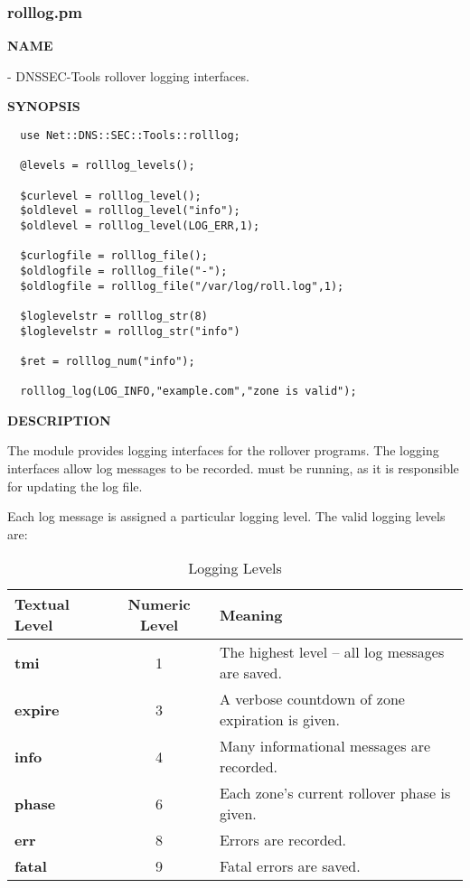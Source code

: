 \clearpage

\subsubsection{rolllog.pm}

{\bf NAME}

 - DNSSEC-Tools rollover logging
interfaces.

{\bf SYNOPSIS}

\begin{verbatim}
  use Net::DNS::SEC::Tools::rolllog;

  @levels = rolllog_levels();

  $curlevel = rolllog_level();
  $oldlevel = rolllog_level("info");
  $oldlevel = rolllog_level(LOG_ERR,1);

  $curlogfile = rolllog_file();
  $oldlogfile = rolllog_file("-");
  $oldlogfile = rolllog_file("/var/log/roll.log",1);

  $loglevelstr = rolllog_str(8)
  $loglevelstr = rolllog_str("info")

  $ret = rolllog_num("info");

  rolllog_log(LOG_INFO,"example.com","zone is valid");
\end{verbatim}

{\bf DESCRIPTION}

The  module provides logging interfaces
for the rollover programs.  The logging interfaces allow log messages to be
recorded.   must be running, as it is responsible for updating
the log file.

Each log message is assigned a particular logging level.  The valid logging
levels are:

\begin{table}[h]
\begin{center}
\begin{tabular}{|l|c|l|}
\hline
{\bf Textual Level} & {\bf Numeric Level} & {\bf Meaning} \\
\hline
{\bf tmi}    & 1 & The highest level -- all log messages are saved.	\\
{\bf expire} & 3 & A verbose countdown of zone expiration is given.	\\
{\bf info}   & 4 & Many informational messages are recorded.		\\
{\bf phase}  & 6 & Each zone's current rollover phase is given.		\\
{\bf err}    & 8 & Errors are recorded.					\\
{\bf fatal}  & 9 & Fatal errors are saved.				\\
\hline
\end{tabular}
\end{center}
\caption{Logging Levels}
\end{table}

